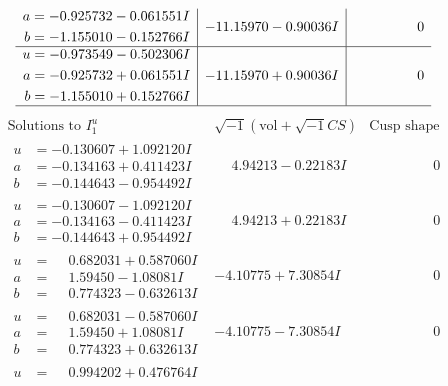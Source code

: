 \documentclass[1p]{elsarticle_modified}
\theoremstyle{definition}
\newcommand{\I}{\sqrt{-1}}
\begin{document}
$$\begin{array}{c|c|c}
\begin{aligned}
a &= -0.925732 - 0.061551 I \\
b &= -1.155010 - 0.152766 I\end{aligned}
 & -11.15970 - 0.90036 I & \phantom{-0.000000 } 0 \\ \hline\begin{aligned}
u &= -0.973549 - 0.502306 I \\
a &= -0.925732 + 0.061551 I \\
b &= -1.155010 + 0.152766 I\end{aligned}
 & -11.15970 + 0.90036 I & \phantom{-0.000000 } 0\\
 \hline 
 \end{array}$$\newpage$$\begin{array}{c|c|c}  
\text{Solutions to }I^u_{1}& \I (\text{vol} + \sqrt{-1}CS) & \text{Cusp shape}\\
 \hline 
\begin{aligned}
u &= -0.130607 + 1.092120 I \\
a &= -0.134163 + 0.411423 I \\
b &= -0.144643 - 0.954492 I\end{aligned}
 & \phantom{-}4.94213 - 0.22183 I & \phantom{-0.000000 } 0 \\ \hline\begin{aligned}
u &= -0.130607 - 1.092120 I \\
a &= -0.134163 - 0.411423 I \\
b &= -0.144643 + 0.954492 I\end{aligned}
 & \phantom{-}4.94213 + 0.22183 I & \phantom{-0.000000 } 0 \\ \hline\begin{aligned}
u &= \phantom{-}0.682031 + 0.587060 I \\
a &= \phantom{-}1.59450 - 1.08081 I \\
b &= \phantom{-}0.774323 - 0.632613 I\end{aligned}
 & -4.10775 + 7.30854 I & \phantom{-0.000000 } 0 \\ \hline\begin{aligned}
u &= \phantom{-}0.682031 - 0.587060 I \\
a &= \phantom{-}1.59450 + 1.08081 I \\
b &= \phantom{-}0.774323 + 0.632613 I\end{aligned}
 & -4.10775 - 7.30854 I & \phantom{-0.000000 } 0 \\ \hline\begin{aligned}
u &= \phantom{-}0.994202 + 0.476764 I \\

\end{aligned}
\end{array}$$
\end{document}
